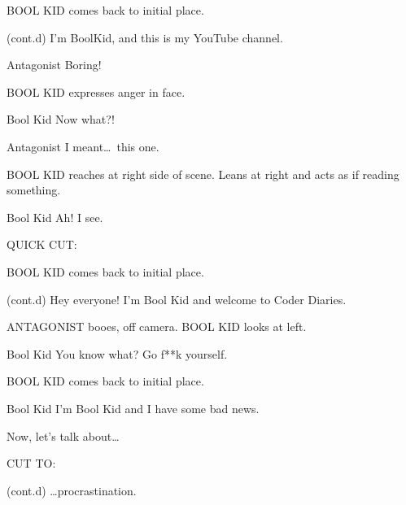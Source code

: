 \documentclass{screenplay}[2018/01/07]
\begin{document}
    BOOL KID comes back to initial place.

    \begin{dialogue}{(cont.d)}
        I'm BoolKid, and this is my YouTube channel.
    \end{dialogue}

    \begin{dialogue}{Antagonist}
        Boring!
    \end{dialogue}

    BOOL KID expresses anger in face.

    \begin{dialogue}{Bool Kid}
        Now what?!
    \end{dialogue}

    \begin{dialogue}{Antagonist}
        I meant\dots\ this one.
    \end{dialogue}

    BOOL KID reaches at right side of scene. Leans at right and acts as if reading something.

    \begin{dialogue}{Bool Kid}
        Ah! I see.
    \end{dialogue}

    \begin{flushright}
        QUICK CUT:
    \end{flushright}

    BOOL KID comes back to initial place.

    \begin{dialogue}{(cont.d)}
        Hey everyone! I'm Bool Kid and welcome to Coder Diaries.
    \end{dialogue}

    ANTAGONIST booes, off camera.
    BOOL KID looks at left.

    \begin{dialogue}[shouting]{Bool Kid}
        You know what? Go f**k yourself.
    \end{dialogue}

    BOOL KID comes back to initial place.

    \begin{dialogue}{Bool Kid}
        I'm Bool Kid and I have some bad news.

        Now, let's talk about\dots
    \end{dialogue}

    \begin{flushright}
        CUT TO:
    \end{flushright}


    \begin{dialogue}{(cont.d)}
        \dots procrastination.
    \end{dialogue}
    \fadeout

    \theend
\end{document}
